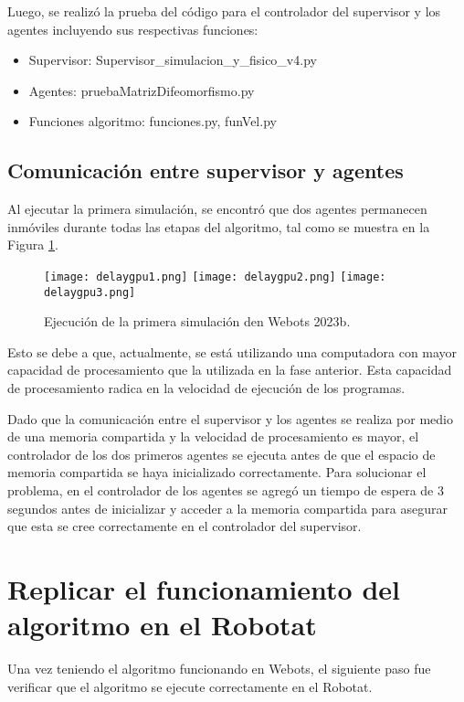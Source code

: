 Luego, se realizó la prueba del código para el controlador del supervisor y los agentes incluyendo sus respectivas funciones:
\begin{itemize}
	\item Supervisor: Supervisor\_simulacion\_y\_fisico\_v4.py
	\item Agentes: pruebaMatrizDifeomorfismo.py
	\item Funciones algoritmo: funciones.py, funVel.py
\end{itemize} 

\subsection{Comunicación entre supervisor y agentes}
Al ejecutar la primera simulación, se encontró que dos agentes permanecen inmóviles durante todas las etapas del algoritmo, tal como se muestra en la Figura \ref{fig:delaygpu}.

\begin{figure}[H]
	\centering
	\texttt{[image: delaygpu1.png]}
	\texttt{[image: delaygpu2.png]}
	\texttt{[image: delaygpu3.png]}
	\caption{Ejecución de la primera simulación den Webots 2023b.}
	\label{fig:delaygpu}
\end{figure}

Esto se debe a que, actualmente, se está utilizando una computadora con mayor capacidad de procesamiento que la utilizada en la fase anterior. Esta capacidad de procesamiento radica en la velocidad de ejecución de los programas. 

Dado que la comunicación entre el supervisor y los agentes se realiza por medio de una memoria compartida y la velocidad de procesamiento es mayor, el controlador de los dos primeros agentes se ejecuta antes de que el espacio de memoria compartida se haya inicializado correctamente. Para solucionar el problema, en el controlador de los agentes se agregó un tiempo de espera de 3 segundos antes de inicializar y acceder a la memoria compartida para asegurar que esta se cree correctamente en el controlador del supervisor.


\section{Replicar el funcionamiento del algoritmo en el Robotat}
Una vez teniendo el algoritmo funcionando en Webots, el siguiente paso fue verificar que el algoritmo se ejecute correctamente en el Robotat.
